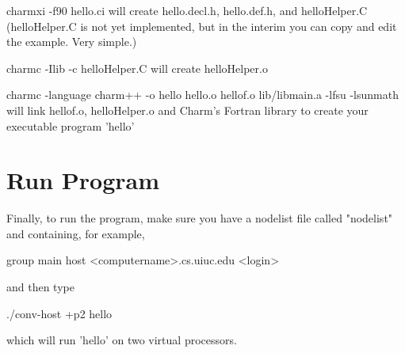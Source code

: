 \documentclass[11pt]{article}
\begin{document}
  charmxi -f90 hello.ci
    will create hello.decl.h, hello.def.h, and helloHelper.C
    (helloHelper.C is not yet implemented, but in the interim
     you can copy and edit the example.  Very simple.)

  charmc -Ilib -c helloHelper.C
    will create helloHelper.o

  charmc -language charm++ -o hello hello.o hellof.o lib/libmain.a -lfsu  -lsunmath
    will link hellof.o, helloHelper.o and Charm's Fortran library
    to create your executable program 'hello'

\section{Run Program}

Finally, to run the program, make sure you have a nodelist file called
"nodelist" and containing, for example,

group main
host <computername>.cs.uiuc.edu <login>

and then type

./conv-host +p2 hello

which will run 'hello' on two virtual processors.
\end{document}
